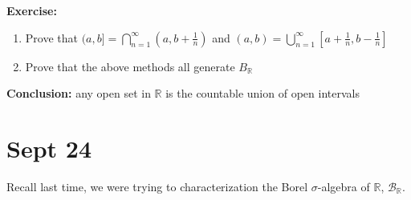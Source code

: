 \documentclass[12pt]{report}
\newcommand{\R}{\mathbb{R}}
\newcommand{\B}{\mathcal{B}}
\newenvironment*{exercise}[1][red]{
    \begin{tcolorbox}[
        parbox=false,
        colback=#1!5!white,
        colframe=#1!75!black,
        breakable
    ]}
    {\end{tcolorbox}}
\begin{document}
        \begin{exercise}
            \textbf{Exercise:} 
            \begin{enumerate}
                \item Prove that $(a, b] = \bigcap_{n=1}^{\infty} (a, b + \frac{1}{n})$ and $(a, b) = \bigcup_{n=1}^{\infty} [a + \frac{1}{n}, b - \frac{1}{n}]$
                \item Prove that the above methods all generate $B_{\R}$ 
            \end{enumerate}
        \end{exercise}

        \textbf{Conclusion:} any open set in $\R$ is the countable union of open intervals

\section{Sept 24}
    Recall last time, we were trying to characterization the Borel $\sigma$-algebra of $\R$, $\B_{\R}$. 
\end{document}

